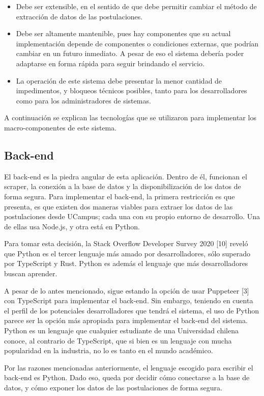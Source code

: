 \begin{itemize}
\item Debe ser extensible, en el sentido de que debe permitir cambiar el método
de extracción de datos de las postulaciones.
\item Debe ser altamente mantenible, pues hay componentes que su actual
implementación depende de componentes o condiciones externas, que podrían
cambiar en un futuro inmediato. A pesar de eso el sistema debería poder
adaptarse en forma rápida para seguir brindando el servicio.
\item La operación de este sistema debe presentar la menor cantidad de
impedimentos, y bloqueos técnicos posibles, tanto para los desarrolladores como
para los administradores de sistemas.
\end{itemize}

A continuación se explican las tecnologías que se utilizaron para implementar
los macro-componentes de este sistema.

\subsection{Back-end}

El back-end es la piedra angular de esta aplicación. Dentro de él, funcionan el
scraper, la conexión a la base de datos y la disponibilización de los datos de
forma segura. Para implementar el back-end, la primera restricción es que
presenta, es que existen dos maneras viables para extraer los datos de las
postulaciones desde UCampus; cada una con su propio entorno de desarrollo. Una
de ellas usa Node.js, y otra está en Python.

Para tomar esta decisión, la Stack Overflow Developer Survey 2020 [10] reveló
que Python es el tercer lenguaje más amado por desarrolladores, sólo superado
por TypeScript y Rust. Python es además el lenguaje que más desarrolladores
buscan aprender.

A pesar de lo antes mencionado, sigue estando la opción de usar Puppeteer [3]
con TypeScript para implementar el back-end. Sin embargo, teniendo en cuenta el
perfil de los potenciales desarrolladores que tendrá el sistema, el uso de
Python parece ser la opción más apropiada para implementar el back-end del
sistema. Python es un lenguaje que cualquier estudiante de una Universidad
chilena conoce, al contrario de TypeScript, que si bien es un lenguaje con mucha
popularidad en la industria, no lo es tanto en el mundo académico.

Por las razones mencionadas anteriormente, el lenguaje escogido para escribir el
back-end es Python. Dado eso, queda por decidir cómo conectarse a la base de
datos, y cómo exponer los datos de las postulaciones de forma segura.



